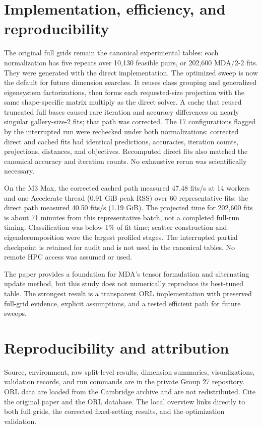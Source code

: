 \documentclass[10pt]{article}
\begin{document}
\section{Implementation, efficiency, and reproducibility}
The original full grids remain the canonical experimental tables: each normalization has five repeats over 10,130 feasible pairs, or 202,600 MDA/2-2 fits. They were generated with the direct implementation. The optimized sweep is now the default for future dimension searches. It reuses class grouping and generalized eigensystem factorizations, then forms each requested-size projection with the same shape-specific matrix multiply as the direct solver. A cache that reused truncated full bases caused rare iteration and accuracy differences on nearly singular gallery-size-2 fits; that path was corrected. The 17 configurations flagged by the interrupted run were rechecked under both normalizations: corrected direct and cached fits had identical predictions, accuracies, iteration counts, projections, distances, and objectives. Recomputed direct fits also matched the canonical accuracy and iteration counts. No exhaustive rerun was scientifically necessary.

On the M3 Max, the corrected cached path measured 47.48 fits/s at 14 workers and one Accelerate thread (0.91 GiB peak RSS) over 60 representative fits; the direct path measured 40.50 fits/s (1.19 GiB). The projected time for 202,600 fits is about 71 minutes from this representative batch, not a completed full-run timing. Classification was below 1\% of fit time; scatter construction and eigendecomposition were the largest profiled stages. The interrupted partial checkpoint is retained for audit and is not used in the canonical tables. No remote HPC access was assumed or used.

The paper provides a foundation for MDA's tensor formulation and alternating update method, but this study does not numerically reproduce its best-tuned table. The strongest result is a transparent ORL implementation with preserved full-grid evidence, explicit assumptions, and a tested efficient path for future sweeps.

\section*{Reproducibility and attribution}
Source, environment, raw split-level results, dimension summaries, visualizations, validation records, and run commands are in the private Group 27 repository. ORL data are loaded from the Cambridge archive and are not redistributed. Cite the original paper \citep{Yan2007MDA} and the ORL database. The local overview links directly to both full grids, the corrected fixed-setting results, and the optimization validation.



\end{document}
